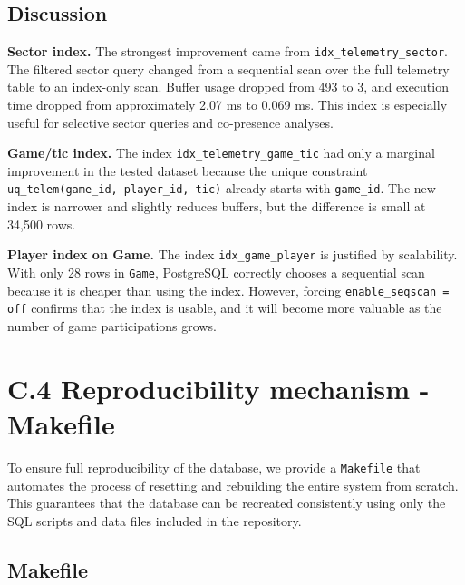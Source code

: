 \documentclass[11pt]{article}
\begin{document}
\subsection{Discussion}
\textbf{Sector index.} The strongest improvement came from \texttt{idx\_telemetry\_sector}. The filtered sector query changed from a sequential scan over the full telemetry table to an index-only scan. Buffer usage dropped from 493 to 3, and execution time dropped from approximately 2.07 ms to 0.069 ms. This index is especially useful for selective sector queries and co-presence analyses.

\textbf{Game/tic index.} The index \texttt{idx\_telemetry\_game\_tic} had only a marginal improvement in the tested dataset because the unique constraint \texttt{uq\_telem(game\_id, player\_id, tic)} already starts with \texttt{game\_id}. The new index is narrower and slightly reduces buffers, but the difference is small at 34,500 rows.

\textbf{Player index on Game.} The index \texttt{idx\_game\_player} is justified by scalability. With only 28 rows in \texttt{Game}, PostgreSQL correctly chooses a sequential scan because it is cheaper than using the index. However, forcing \texttt{enable\_seqscan = off} confirms that the index is usable, and it will become more valuable as the number of game participations grows.
\clearpage

\section{C.4 Reproducibility mechanism - Makefile}

To ensure full reproducibility of the database, we provide a \texttt{Makefile} that automates the process of resetting and rebuilding the entire system from scratch. This guarantees that the database can be recreated consistently using only the SQL scripts and data files included in the repository.

\subsection{Makefile}

\lstset{
    breaklines=true,
    basicstyle=\ttfamily\small
}
\end{document}
